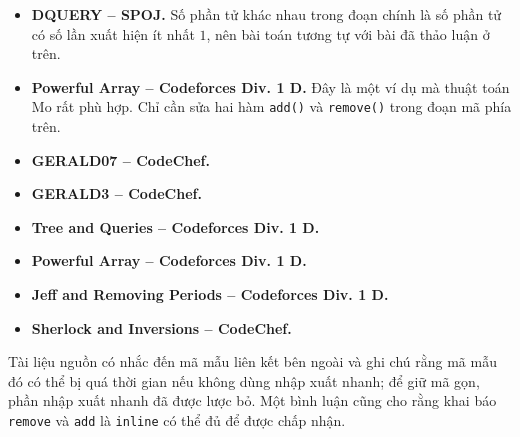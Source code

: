\documentclass[11pt]{article}
\begin{document}
\begin{itemize}
  \item \textbf{DQUERY -- SPOJ.} Số phần tử khác nhau trong đoạn chính là số
  phần tử có số lần xuất hiện ít nhất $1$, nên bài toán tương tự với bài đã
  thảo luận ở trên.

  \item \textbf{Powerful Array -- Codeforces Div. 1 D.} Đây là một ví dụ mà
  thuật toán Mo rất phù hợp. Chỉ cần sửa hai hàm \texttt{add()} và
  \texttt{remove()} trong đoạn mã phía trên.

  \item \textbf{GERALD07 -- CodeChef.}

  \item \textbf{GERALD3 -- CodeChef.}

  \item \textbf{Tree and Queries -- Codeforces Div. 1 D.}

  \item \textbf{Powerful Array -- Codeforces Div. 1 D.}

  \item \textbf{Jeff and Removing Periods -- Codeforces Div. 1 D.}

  \item \textbf{Sherlock and Inversions -- CodeChef.}
\end{itemize}

Tài liệu nguồn có nhắc đến mã mẫu liên kết bên ngoài và ghi chú rằng mã mẫu đó
có thể bị quá thời gian nếu không dùng nhập xuất nhanh; để giữ mã gọn, phần
nhập xuất nhanh đã được lược bỏ. Một bình luận cũng cho rằng khai báo
\texttt{remove} và \texttt{add} là \texttt{inline} có thể đủ để được chấp nhận.
\end{document}
